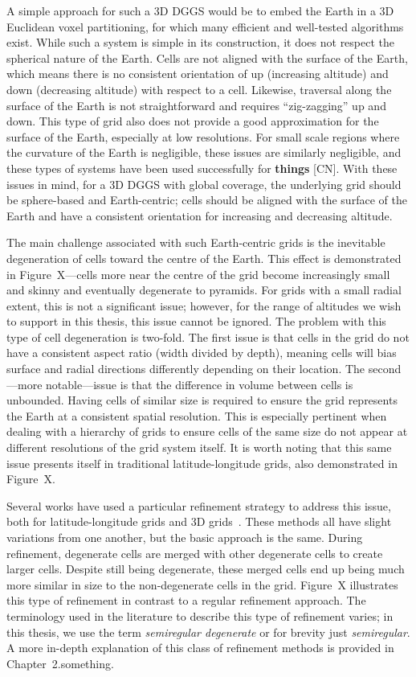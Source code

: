 A simple approach for such a 3D DGGS would be to embed the Earth in a 3D Euclidean voxel partitioning, for which many efficient and well-tested algorithms exist.
While such a system is simple in its construction, it does not respect the spherical nature of the Earth.
Cells are not aligned with the surface of the Earth, which means there is no consistent orientation of up (increasing altitude) and down (decreasing altitude) with respect to a cell.
Likewise, traversal along the surface of the Earth is not straightforward and requires ``zig-zagging'' up and down.
This type of grid also does not provide a good approximation for the surface of the Earth, especially at low resolutions.
For small scale regions where the curvature of the Earth is negligible, these issues are similarly negligible, and these types of systems have been used successfully for \textbf{things} [CN].
With these issues in mind, for a 3D DGGS with global coverage, the underlying grid should be sphere-based and Earth-centric; cells should be aligned with the surface of the Earth and have a consistent orientation for increasing and decreasing altitude. 

The main challenge associated with such Earth-centric grids is the inevitable degeneration of cells toward the centre of the Earth.
This effect is demonstrated in Figure~X---cells more near the centre of the grid become increasingly small and skinny and eventually degenerate to pyramids.
For grids with a small radial extent, this is not a significant issue; however, for the range of altitudes we wish to support in this thesis, this issue cannot be ignored.
The problem with this type of cell degeneration is two-fold.
The first issue is that cells in the grid do not have a consistent aspect ratio (width divided by depth), meaning cells will bias surface and radial directions differently depending on their location.
The second---more notable---issue is that the difference in volume between cells is unbounded.
Having cells of similar size is required to ensure the grid represents the Earth at a consistent spatial resolution.
This is especially pertinent when dealing with a hierarchy of grids to ensure cells of the same size do not appear at different resolutions of the grid system itself.
It is worth noting that this same issue presents itself in traditional latitude-longitude grids, also demonstrated in Figure~X. 

Several works have used a particular refinement strategy to address this issue, both for latitude-longitude grids and 3D grids~\cite{yu2009sdog, gang2013sphere}\cite{others}.
These methods all have slight variations from one another, but the basic approach is the same.
During refinement, degenerate cells are merged with other degenerate cells to create larger cells.
Despite still being degenerate, these merged cells end up being much more similar in size to the non-degenerate cells in the grid.
Figure~X illustrates this type of refinement in contrast to a regular refinement approach.
The terminology used in the literature to describe this type of refinement varies; in this thesis, we use the term \textit{semiregular degenerate} or for brevity just \textit{semiregular}.
A more in-depth explanation of this class of refinement methods is provided in Chapter~2.something.


